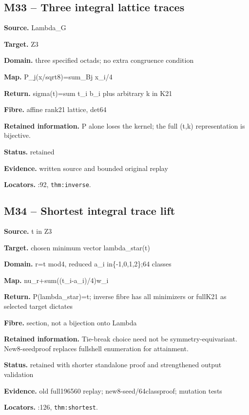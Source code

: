 \subsection*{M33 -- Three integral lattice traces}
\noindent\textbf{Source.} Lambda\_G\par
\noindent\textbf{Target.} Z3\par
\noindent\textbf{Domain.} three specified octads; no extra congruence condition\par
\noindent\textbf{Map.} P\_j(x/sqrt8)=sum\_Bj x\_i/4\par
\noindent\textbf{Return.} sigma(t)=sum t\_i b\_i plus arbitrary k in K21\par
\noindent\textbf{Fibre.} affine rank21 lattice, det64\par
\noindent\textbf{Retained information.} P alone loses the kernel; the full (t,k) representation is bijective.\par
\noindent\textbf{Status.} retained\par
\noindent\textbf{Evidence.} written source and bounded original replay\par
\noindent\textbf{Locators.} :92, \texttt{thm:inverse}.
\subsection*{M34 -- Shortest integral trace lift}
\noindent\textbf{Source.} t in Z3\par
\noindent\textbf{Target.} chosen minimum vector lambda\_star(t)\par
\noindent\textbf{Domain.} r=t mod4, reduced a\_i in\{-1,0,1,2\};64 classes\par
\noindent\textbf{Map.} nu\_r+sum((t\_i-a\_i)/4)w\_i\par
\noindent\textbf{Return.} P(lambda\_star)=t; inverse fibre has all minimizers or fullK21 as selected target dictates\par
\noindent\textbf{Fibre.} section, not a bijection onto Lambda\par
\noindent\textbf{Retained information.} Tie-break choice need not be symmetry-equivariant. New8-seedproof replaces fullshell enumeration for attainment.\par
\noindent\textbf{Status.} retained with shorter standalone proof and strengthened output validation\par
\noindent\textbf{Evidence.} old full196560 replay; new8-seed/64classproof; mutation tests\par
\noindent\textbf{Locators.} :126, \texttt{thm:shortest}.
